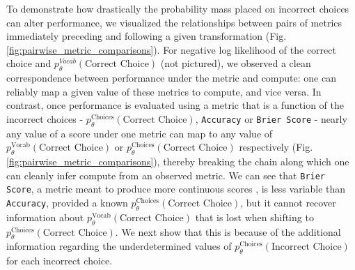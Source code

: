 To demonstrate how drastically the probability mass placed on incorrect choices can alter performance, we visualized the relationships between pairs of metrics immediately preceding and following a given transformation (Fig. \ref{fig:pairwise_metric_comparisons}). For negative log likelihood of the correct choice and $p_{\theta}^{Vocab}(\text{Correct Choice})$ (not pictured), we observed a clean correspondence between performance under the metric and compute: one can reliably map a given value of these metrics to compute, and vice versa. In contrast, once performance is evaluated using a metric that is a function of the incorrect choices - $p_{\theta}^{\text{Choices}}(\text{Correct Choice})$, \texttt{Accuracy} or \texttt{Brier Score} - nearly any value of a score under one metric can map to any value of $p_{\theta}^{\text{Vocab}}(\text{Correct Choice})$ or $p_{\theta}^{\text{Choices}}(\text{Correct Choice})$ respectively (Fig. \ref{fig:pairwise_metric_comparisons}), thereby breaking the chain along which one can cleanly infer compute from an observed metric. We can see that \texttt{Brier Score}, a metric meant to produce more continuous scores \citep{schaeffer2023mirage}, is less variable than \texttt{Accuracy}, provided a known $p_{\theta}^{\text{Choices}}(\text{Correct Choice})$, but it cannot recover information about $p_{\theta}^{\text{Vocab}}(\text{Correct Choice})$ that is lost when shifting to $p_{\theta}^{\text{Choices}}(\text{Correct Choice})$. We next show that this is because of the additional information regarding the underdetermined values of $p_{\theta}^{\text{Choices}}(\text{Incorrect Choice})$ for each incorrect choice.